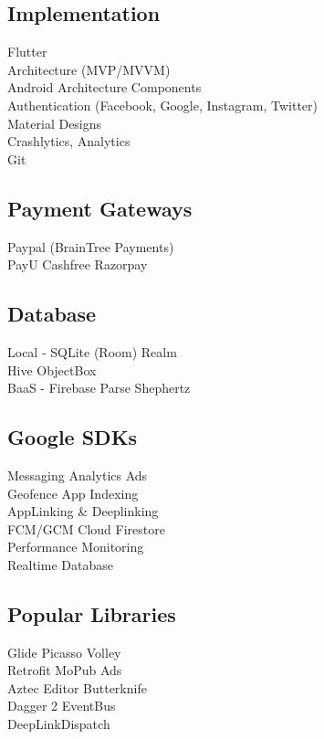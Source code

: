 \documentclass[]{deedy-resume-openfont}
\begin{document}
\begin{minipage}[t]{0.33\textwidth}
\subsection{Implementation}
Flutter \\
Architecture (MVP/MVVM) \\
Android Architecture Components \\
Authentication (Facebook, Google, Instagram, Twitter) \\
Material Designs \\
Crashlytics, Analytics \\
Git \\

\sectionsep

\subsection{Payment Gateways}
Paypal (BrainTree Payments) \\PayU \textbullet{} Cashfree \textbullet{} Razorpay \\ 

\sectionsep

\subsection{Database}
Local - SQLite (Room) \textbullet{} Realm \\ Hive  \textbullet{} ObjectBox \\
BaaS  - Firebase \textbullet{} Parse \textbullet{} Shephertz

\sectionsep

\subsection{Google SDKs}
Messaging \textbullet{} Analytics \textbullet{} Ads\\
Geofence \textbullet{} App Indexing \\
AppLinking \& Deeplinking\\ 
FCM/GCM \textbullet{} Cloud Firestore \\ Performance Monitoring \\
Realtime Database

\sectionsep

\subsection{Popular Libraries}
Glide \textbullet{} Picasso \textbullet{} Volley\\
Retrofit \textbullet{} MoPub Ads \\ 
Aztec Editor  \textbullet{} Butterknife\\
Dagger 2 \textbullet{} EventBus\\
DeepLinkDispatch 


\end{minipage}
\end{document}
